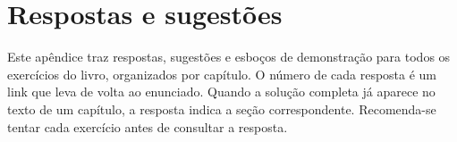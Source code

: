 \chapter{Respostas e sugestões}\label{ap:respostas}
Este apêndice traz respostas, sugestões e esboços de demonstração para todos os exercícios do livro, organizados por capítulo. O número de cada resposta é um link que leva de volta ao enunciado. Quando a solução completa já aparece no texto de um capítulo, a resposta indica a seção correspondente. Recomenda-se tentar cada exercício antes de consultar a resposta.

\small





















\normalsize
